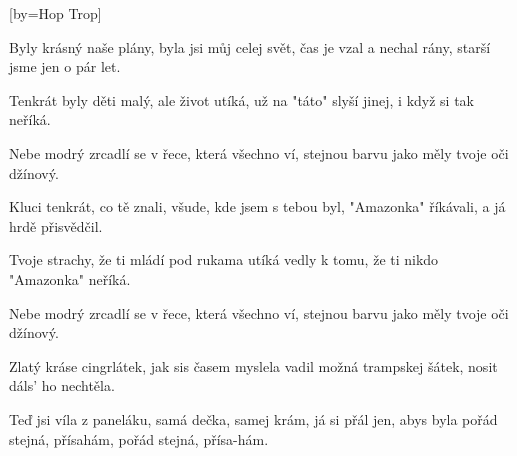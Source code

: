[by={Hop Trop}]

\beginverse{}
Byly krásný naše plány, 
byla jsi můj celej svět,  
čas je vzal a nechal rány, 
starší jsme jen o pár let. 
\endverse{}

\beginverse{}
Tenkrát byly děti malý, 
ale život utíká,  
už na "táto" slyší jinej, 
i když si tak neříká.  
\endverse{}

\beginchorus{}
Nebe modrý zrcadlí se 
v řece, která všechno ví,
stejnou barvu jako měly  
tvoje oči džínový.  
\endchorus{}

\beginverse{}
Kluci tenkrát, co tě znali, 
všude, kde jsem s tebou byl,  
"Amazonka" říkávali, 
a já hrdě přisvědčil. 
\endverse{}

\beginverse{}
Tvoje strachy, že ti mládí 
pod rukama utíká  
vedly k tomu, že ti nikdo 
"Amazonka" neříká.  
\endverse{}

\beginchorus{}
Nebe modrý zrcadlí se 
v řece, která všechno ví,
stejnou barvu jako měly  
tvoje oči džínový.  
\endchorus{}

\beginverse{}
Zlatý kráse cingrlátek, 
jak sis časem myslela  
vadil možná trampskej šátek, 
nosit dáls' ho nechtěla.  
\endverse{}

\beginchorus{}
Teď jsi víla z paneláku, 
samá dečka, samej krám,
já si přál jen, abys byla 
pořád stejná, přísahám, 
pořád stejná, přísa-hám.
\endchorus{}

\endsong{}
